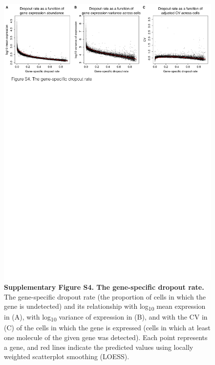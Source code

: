 \begin{figure}[htbp]
\centering
\includegraphics[width=5in]{img/ch04/Figure09.jpeg}
\caption{\textbf{Supplementary Figure S4. The gene-specific dropout
rate.} The gene-specific dropout rate (the proportion of cells in which
the gene is undetected) and its relationship with log\textsubscript{10}
mean expression in (A), with log\textsubscript{10} variance of
expression in (B), and with the CV in (C) of the cells in which the gene
is expressed (cells in which at least one molecule of the given gene was
detected). Each point represents a gene, and red lines indicate the
predicted values using locally weighted scatterplot smoothing (LOESS).}
\end{figure}

